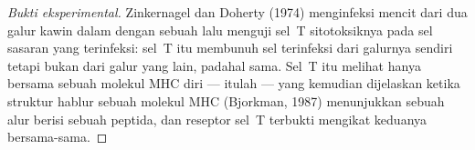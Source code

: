 \begin{proof}[Bukti eksperimental]
Zinkernagel dan Doherty (1974) menginfeksi mencit dari dua galur kawin dalam
dengan sebuah  lalu menguji sel~T sitotoksiknya pada sel sasaran yang
terinfeksi: sel~T itu membunuh sel terinfeksi dari galurnya sendiri tetapi bukan
dari galur yang lain, padahal  sama. Sel~T itu melihat  hanya
bersama sebuah molekul MHC diri --- itulah \emph{} --- yang
kemudian dijelaskan ketika struktur hablur sebuah molekul MHC
(Bjorkman, 1987) menunjukkan sebuah alur berisi sebuah peptida, dan reseptor
sel~T terbukti mengikat keduanya bersama-sama.
\end{proof}

